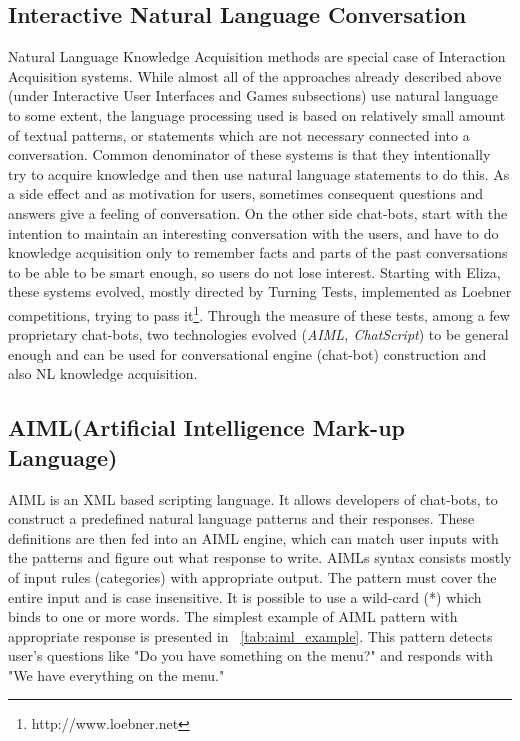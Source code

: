 \subsection{Interactive Natural Language Conversation}
\label{section:r:inlc}
Natural Language Knowledge Acquisition methods are special case of Interaction 
Acquisition systems. While almost all of the approaches already described above
(under Interactive User Interfaces and Games subsections) use natural language 
to some extent, the language processing used is based on relatively small amount
of textual patterns, or statements which are not necessary connected into a 
conversation. Common denominator of these systems is that they intentionally try
to acquire knowledge and then use natural language statements to do this. As a 
side effect and as motivation for users, sometimes consequent questions and 
answers give a feeling of conversation. On the other side chat-bots, start with
the intention to maintain an interesting conversation with the users, and have 
to do knowledge acquisition only to remember facts and parts of the past 
conversations to be able to be smart enough, so users do not lose interest.
Starting with Eliza\parencite{Weizenbaum1966}, these systems evolved, mostly 
directed by Turning Tests\parencite{Turing?}, implemented as Loebner 
competitions, trying to pass it\footnote{http://www.loebner.net}. Through the 
measure of these tests\parencite{Bradesko2012}, among a few proprietary 
chat-bots, two technologies evolved (\emph{AIML, ChatScript}) to be general 
enough and can be used for conversational engine (chat-bot) construction and 
also NL knowledge acquisition.

\subsection{AIML(Artificial Intelligence Mark-up Language)}
\label{section:r:aiml}
AIML is an XML based 
scripting language. It allows developers of chat-bots, to construct a predefined
natural language patterns and their responses. These definitions are 
then fed into an AIML engine, which can match user inputs with the patterns and 
figure out what response to write. AIMLs syntax consists mostly of input rules 
(categories) with appropriate output. The pattern must cover the entire input 
and is case insensitive. It is possible to use a wild-card (*) which binds to 
one or more words. The simplest example of AIML pattern with appropriate 
response is presented in \tablename~\ref{tab:aiml_example}. This pattern 
detects user's questions like "Do you have something on the menu?" and responds 
with "We have everything on the menu."

